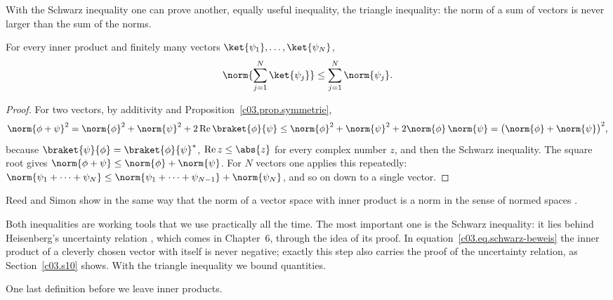 With the Schwarz inequality one can prove another, equally useful inequality, the triangle
inequality: the norm of a sum of vectors is never larger than the sum of the norms.

\begin{proposition}\label{c03.prop.dreieck}
  For every inner product and finitely many vectors $\ket{\psi_1}, \dots, \ket{\psi_N}$,
  \begin{equation}\label{c03.eq.dreieck}
    \norm{\sum_{j=1}^{N} \ket{\psi_j}} \leq \sum_{j=1}^{N} \norm{\psi_j} .
  \end{equation}
\end{proposition}
\begin{proof}
  For two vectors, by additivity and Proposition~\ref{c03.prop.symmetrie},
  \begin{equation}\label{c03.eq.dreieck-beweis}
    \norm{\phi + \psi}^2
      = \norm{\phi}^2 + \norm{\psi}^2 + 2 \operatorname{Re} \braket{\phi}{\psi}
      \leq \norm{\phi}^2 + \norm{\psi}^2 + 2 \norm{\phi}\, \norm{\psi}
      = \bigl( \norm{\phi} + \norm{\psi} \bigr)^2 ,
  \end{equation}
  because $\braket{\psi}{\phi} = \braket{\phi}{\psi}^*$, $\operatorname{Re} z \leq \abs{z}$ for
  every complex number $z$, and then the Schwarz inequality. The square root gives
  $\norm{\phi + \psi} \leq \norm{\phi} + \norm{\psi}$. For $N$ vectors one applies this
  repeatedly: $\norm{\psi_1 + \dots + \psi_N} \leq \norm{\psi_1 + \dots + \psi_{N-1}} + \norm{\psi_N}$,
  and so on down to a single vector.
\end{proof}

Reed and Simon show in the same way that the norm of a vector space with inner product is a norm
in the sense of normed spaces .

Both inequalities are working tools that we use practically all the time. The most important
one is the Schwarz inequality: it lies behind Heisenberg's uncertainty relation
, which comes in Chapter~6, through
the idea of its proof. In equation~\eqref{c03.eq.schwarz-beweis} the inner product of a
cleverly chosen vector with itself is never negative; exactly this step also carries the proof
of the uncertainty relation, as Section~\ref{c03.s10} shows. With the triangle inequality we
bound quantities.

One last definition before we leave inner products.

